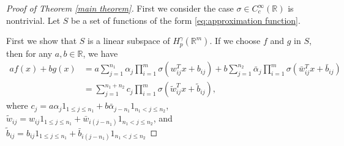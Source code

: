 \documentclass[11pt,reqno]{amsart}
\numberwithin{equation}{section}
\theoremstyle{remark}
\theoremstyle{definition}
\newcommand\bR{\mathbb{R}}
\begin{document}
\begin{proof}[Proof of Theorem \ref{main theorem}]
First we consider the case $\sigma\in C_{c}^{\infty}(\bR)$ is nontrivial. Let $S$ be a set of functions of the form \eqref{eq:approximation function}. 

First we show that $S$ is a linear subspace of $H_p^\gamma(\bR^{m})$. If we choose $f$ and $g$ in $S$, then for any $a,b\in\bR$, we have
\begin{equation*}
\begin{aligned}
af(x) + bg(x)
&= a\sum_{j = 1}^{n_{1}}\alpha_{j} \prod_{i = 1}^{m}\sigma\left( w^{T}_{ij} x + b_{ij} \right) + b\sum_{j = 1}^{n_{2}}\bar\alpha_{j} \prod_{i = 1}^{m}\sigma\left( \bar w^{T}_{ij} x + \bar b_{ij} \right) \\
&= \sum_{j = 1}^{n_{1} + n_{2}}c_{j} \prod_{i = 1}^{m}\sigma\left( \tilde w^{T}_{ij} x + \tilde b_{ij} \right),
\end{aligned}
\end{equation*}
where $c_{j} = a\alpha_{j}1_{1\leq j \leq n_{1}} +b\bar \alpha_{j-n_{1}}1_{n_{1} < j \leq n_{2}}$, $\tilde w_{ij} = w_{ij}1_{1\leq j \leq n_{1}}+\bar w_{i(j-n_{1})}1_{n_{1} < j \leq n_{2}}$, and $\tilde b_{ij} = b_{ij}1_{1\leq j \leq n_{1}}+\bar b_{i(j-n_{1})}1_{n_{1} < j \leq n_{2}}$


\end{proof}
\end{document}
